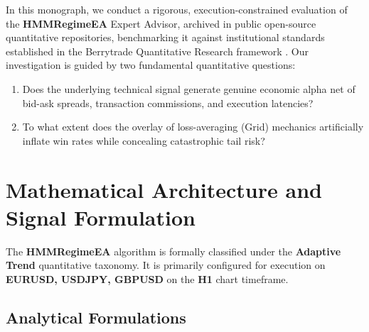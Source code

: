 \documentclass[11pt,a4paper]{article}
\begin{document}
In this monograph, we conduct a rigorous, execution-constrained evaluation of the \textbf{HMMRegimeEA} Expert Advisor, archived in public open-source quantitative repositories, benchmarking it against institutional standards established in the Berrytrade Quantitative Research framework \cite{artsu2026illusion}. Our investigation is guided by two fundamental quantitative questions:
\begin{enumerate}
    \item Does the underlying technical signal generate genuine economic alpha net of bid-ask spreads, transaction commissions, and execution latencies?
    \item To what extent does the overlay of loss-averaging (Grid) mechanics artificially inflate win rates while concealing catastrophic tail risk?
\end{enumerate}

\section{Mathematical Architecture and Signal Formulation}
The \textbf{HMMRegimeEA} algorithm is formally classified under the \textbf{Adaptive Trend} quantitative taxonomy. It is primarily configured for execution on \textbf{EURUSD, USDJPY, GBPUSD} on the \textbf{H1} chart timeframe.

\subsection{Analytical Formulations}
\end{document}
